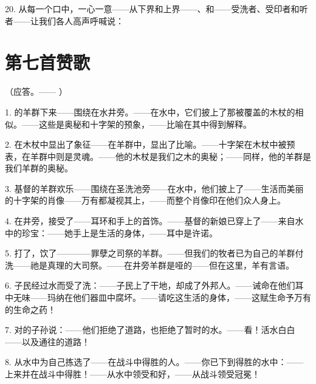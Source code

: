 20. 从每一个口中，一心一意——从下界和上界——、和——受洗者、受印者和听者——让我们各人高声呼喊说：\par


\section{第七首赞歌}

（应答。—— ）\par

1. 的羊群下来——围绕在水井旁。——在水中，它们披上了那被覆盖的木杖的相似。——这些是奥秘和十字架的预象，——比喻在其中得到解释。\par

2. 在木杖中显出了象征——在羊群中，显出了比喻。——十字架在木杖中被预表，在羊群中则是灵魂。——他的木杖是我们之木的奥秘；——同样，他的羊群是我们羊群的奥秘。\par

3. 基督的羊群欢乐——围绕在圣洗池旁——在水中，他们披上了——生活而美丽的十字架的肖像——万有都凝视其上，——而整个肖像印在他们众人身上。\par

4. 在井旁，接受了——耳环和手上的首饰。——基督的新娘已穿上了——来自水中的珍宝：——她手上是生活的身体，——耳中是许诺。\par

5. 打了，饮了————罪孽之司祭的羊群。——但我们的牧者已为自己的羊群付洗——祂是真理的大司祭。——在井旁羊群是哑的——但在这里，羊有言语。\par

6. 子民经过水而受了洗：——子民上了干地，却成了外邦人。——诫命在他们耳中无味——玛纳在他们器皿中腐坏。——请吃这生活的身体，——这赋生命予万有的生命之药！\par

7. 对的子孙说：——他们拒绝了道路，也拒绝了暂时的水。——看！活水白白——以及通往的道路！\par

8. 从水中为自己拣选了——在战斗中得胜的人。——你已下到得胜的水中：——上来并在战斗中得胜！——从水中领受和好，——从战斗领受冠冕！\par

